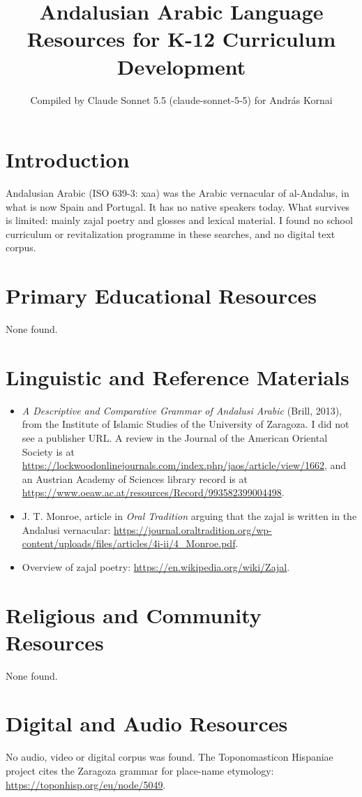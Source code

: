\documentclass[12pt]{article}
\title{Andalusian Arabic Language Resources for K-12 Curriculum Development}
\author{Compiled by Claude Sonnet 5.5 (claude-sonnet-5-5) for Andr\'as Kornai}
\date{}
\begin{document}
\maketitle

\section{Introduction}
Andalusian Arabic (ISO 639-3: xaa) was the Arabic vernacular of al-Andalus, in what is now Spain and Portugal. It has no native speakers today. What survives is limited: mainly zajal poetry and glosses and lexical material. I found no school curriculum or revitalization programme in these searches, and no digital text corpus.

\section{Primary Educational Resources}
None found.

\section{Linguistic and Reference Materials}
\begin{itemize}
\item \emph{A Descriptive and Comparative Grammar of Andalusi Arabic} (Brill, 2013), from the Institute of Islamic Studies of the University of Zaragoza. I did not see a publisher URL. A review in the Journal of the American Oriental Society is at \url{https://lockwoodonlinejournals.com/index.php/jaos/article/view/1662}, and an Austrian Academy of Sciences library record is at \url{https://www.oeaw.ac.at/resources/Record/993582399004498}.
\item J. T. Monroe, article in \emph{Oral Tradition} arguing that the zajal is written in the Andalusi vernacular: \url{https://journal.oraltradition.org/wp-content/uploads/files/articles/4i-ii/4_Monroe.pdf}.
\item Overview of zajal poetry: \url{https://en.wikipedia.org/wiki/Zajal}.
\end{itemize}

\section{Religious and Community Resources}
None found.

\section{Digital and Audio Resources}
No audio, video or digital corpus was found. The Toponomasticon Hispaniae project cites the Zaragoza grammar for place-name etymology: \url{https://toponhisp.org/eu/node/5049}.
\end{document}
